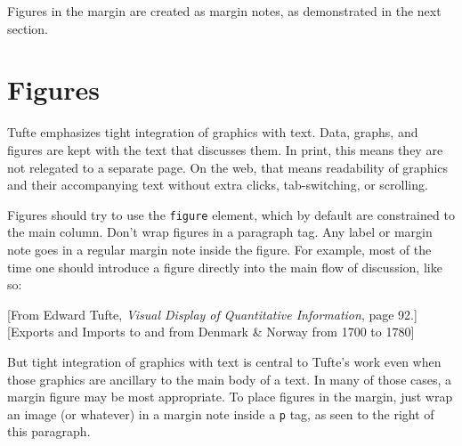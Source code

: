 \documentclass{article}
\begin{document}
Figures in the margin are created as margin notes, as demonstrated in the next section.

\section{Figures}
Tufte emphasizes tight integration of graphics with text. Data, graphs, and figures are kept with the text that discusses them. In print, this means they are not relegated to a separate page. On the web, that means readability of graphics and their accompanying text without extra clicks, tab-switching, or scrolling.

Figures should try to use the \texttt{figure} element, which by default are constrained to the main column. Don’t wrap figures in a paragraph tag. Any label or margin note goes in a regular margin note inside the figure. For example, most of the time one should introduce a figure directly into the main flow of discussion, like so:

[From Edward Tufte, \emph{Visual Display of Quantitative Information}, page 92.][Exports and Imports to and from Denmark \& Norway from 1700 to 1780]


But tight integration of graphics with text is central to Tufte’s work even when those graphics are ancillary to the main body of a text. In many of those cases, a margin figure may be most appropriate. To place figures in the margin, just wrap an image (or whatever) in a margin note inside a \texttt{p} tag, as seen to the right of this paragraph.
\end{document}

